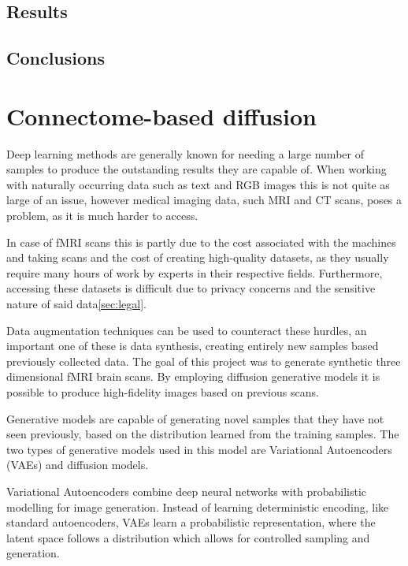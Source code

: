 	\subsection{Results}
	
	\subsection{Conclusions}

\section{Connectome-based diffusion}
\label{sec:diffusion}
	
	Deep learning methods are generally known for needing a large number of samples to produce the outstanding results they are capable of\cite{alzubaidi2023survey}. When working with naturally occurring data such as text and RGB images this is not quite as large of an issue, however medical
	imaging data, such MRI and CT scans, poses a problem, as it is much harder to access.
	
	In case of fMRI scans this is partly due to the cost associated with the machines and taking scans and the cost of creating high-quality datasets, as they usually require many hours of work by experts in their respective fields. Furthermore, accessing these datasets is difficult due to privacy concerns and the sensitive nature of said data\ref{sec:legal}.

	Data augmentation techniques can be used to counteract these hurdles, an important one of these is data synthesis, creating entirely new samples based previously collected data. The goal of this project was to generate synthetic three dimensional fMRI brain scans. By employing diffusion generative models it is possible to produce high-fidelity images based on previous scans.
	
	Generative models are capable of generating novel samples that they have not seen previously, based on the distribution learned from the training samples. The two types of generative models used in this model are Variational Autoencoders (VAEs) and diffusion models.
	
	Variational Autoencoders combine deep neural networks with probabilistic modelling for image generation\cite{kingma2013auto}. Instead of learning deterministic encoding, like standard autoencoders\cite{bank2023autoencoders}, VAEs learn a probabilistic representation, where the latent space follows a distribution which allows for controlled sampling and generation.
	
